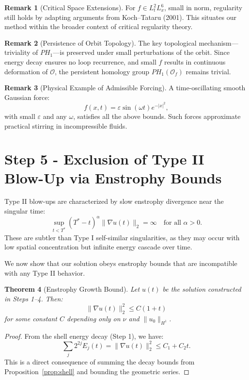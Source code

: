 \documentclass[11pt]{article}
\newtheorem{theorem}{Theorem}[section]
\theoremstyle{definition}
\newtheorem{remark}[theorem]{Remark}
\begin{document}
\begin{remark}[Critical Space Extensions]
For $f \in L^2_t L^6_x$, small in norm, regularity still holds by adapting arguments from Koch–Tataru (2001). This situates our method within the broader context of critical regularity theory.
\end{remark}

\begin{remark}[Persistence of Orbit Topology]
The key topological mechanism—triviality of $PH_1$—is preserved under small perturbations of the orbit. Since energy decay ensures no loop recurrence, and small $f$ results in continuous deformation of $\mathcal{O}$, the persistent homology group $PH_1(\mathcal{O}_f)$ remains trivial.
\end{remark}

\begin{remark}[Physical Example of Admissible Forcing]
A time-oscillating smooth Gaussian force:
\[
f(x,t) = \varepsilon \sin(\omega t) e^{-|x|^2},
\]
with small $\varepsilon$ and any $\omega$, satisfies all the above bounds. Such forces approximate practical stirring in incompressible fluids.
\end{remark}


\section{Step 5 - Exclusion of Type II Blow-Up via Enstrophy Bounds}
\label{sec:step5}

Type II blow-ups are characterized by slow enstrophy divergence near the singular time:
\[
\sup_{t < T^*} (T^* - t)^\alpha \|\nabla u(t)\|_2 = \infty \quad \text{for all } \alpha > 0.
\]
These are subtler than Type I self-similar singularities, as they may occur with low spatial concentration but infinite energy cascade over time.

We now show that our solution obeys enstrophy bounds that are incompatible with any Type II behavior.

\begin{theorem}[Enstrophy Growth Bound]
Let $u(t)$ be the solution constructed in Steps 1–4. Then:
\[
\|\nabla u(t)\|_2^2 \le C(1 + t)
\]
for some constant $C$ depending only on $\nu$ and $\|u_0\|_{H^1}$.
\end{theorem}

\begin{proof}
From the shell energy decay (Step 1), we have:
\[
\sum_j 2^{2j} E_j(t) = \|\nabla u(t)\|_2^2 \le C_1 + C_2 t.
\]
This is a direct consequence of summing the decay bounds from Proposition~\ref{prop:shell} and bounding the geometric series.
\end{proof}
\end{document}
